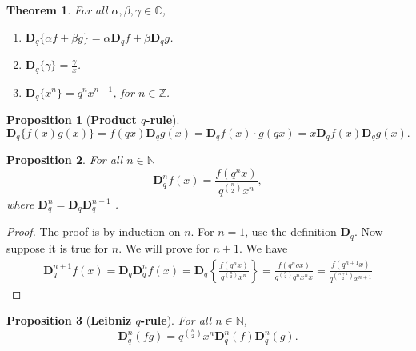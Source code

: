 \documentclass[12pt]{article}
\newcommand{\C}{\mathbb{C}}
\newcommand{\Z}{\mathbb{Z}}
\newcommand{\N}{\mathbb{N}}
\newcommand{\D}{\mathbf{D}}
\newtheorem{theorem}{Theorem}
\newtheorem{proposition}{Proposition}
\newtheorem{remark}{Remark}
\begin{document}
\begin{theorem}\label{prop_properties}
For all $\alpha,\beta,\gamma\in\C$,
\begin{enumerate}
    \item $\mathbf{D}_{q}\{\alpha f+\beta g\}=\alpha\mathbf{D}_{q}f+\beta\mathbf{D}_{q}g$.
    \item $\mathbf{D}_{q}\{\gamma\}=\frac{\gamma}{x}$.
    \item $\mathbf{D}_{q}\{x^{n}\}=q^{n}x^{n-1}$, for $n\in\Z$.
\end{enumerate}
\end{theorem}

    

\begin{proposition}[{\bf Product $q$-rule}]\label{prop_prod_rule}
\begin{equation}
 \mathbf{D}_{q}\{f(x)g(x)\}=f(q x)\mathbf{D}_{q}g(x)=\mathbf{D}_{q}f(x)\cdot g(q x)=x\mathbf{D}_{q}f(x)\mathbf{D}_{q}g(x).   
\end{equation}
\end{proposition}


\begin{proposition}\label{prop_dnf}
For all $n\in\N$
    \begin{equation}
        \mathbf{D}_{q}^{n}f(x)=\frac{f(q^nx)}{q^{\binom{n}{2}}x^n},
    \end{equation}
where $\D_{q}^{n}=\D_{q}\D_{q}^{n-1}$    .
\end{proposition}
\begin{proof}
The proof is by induction on $n$. For $n=1$, use the definition $\mathbf{D}_{q}$. Now suppose it is true for $n$. We will prove for $n+1$. We have
\begin{align*}
    \mathbf{D}_{q}^{n+1}f(x)=\mathbf{D}_{q}\mathbf{D}_{q}^{n}f(x)=\mathbf{D}_{q}\left\{\frac{f(q^nx)}{q^{\binom{n}{2}}x^{n}}\right\}=\frac{f(q^{n}q x)}{q^{\binom{n}{2}}q^nx^nx}=\frac{f(q^{n+1}x)}{q^{\binom{n+1}{2}}x^{n+1}}
\end{align*}
\end{proof}


\begin{proposition}[{\bf Leibniz $q$-rule}]\label{prop_leibniz}
For all $n\in\N$,
\begin{equation}
    \mathbf{D}_{q}^{n}(fg)=q^{\binom{n}{2}}x^{n}\mathbf{D}_{q}^{n}(f)\mathbf{D}_{q}^{n}(g).
\end{equation}    
\end{proposition}
\end{document}
